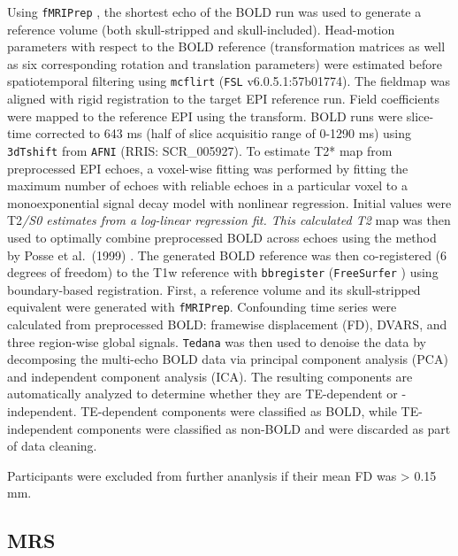 \documentclass[
true
]{sn-jnl}
\begin{document}
Using \texttt{fMRIPrep} \citep{estebanFMRIPrepRobustPreprocessing2019},
the shortest echo of the BOLD run was used to generate a reference
volume (both skull-stripped and skull-included). Head-motion parameters
with respect to the BOLD reference (transformation matrices as well as
six corresponding rotation and translation parameters) were estimated
before spatiotemporal filtering using \texttt{mcflirt}
\citep{jenkinsonImprovedOptimizationRobust2002} (\texttt{FSL}
v6.0.5.1:57b01774). The fieldmap was aligned with rigid registration to
the target EPI reference run. Field coefficients were mapped to the
reference EPI using the transform. BOLD runs were slice-time corrected
to 643 ms (half of slice acquisitio range of 0-1290 ms) using
\texttt{3dTshift} from \texttt{AFNI} \citep{coxAFNISoftwareAnalysis1996}
(RRIS: SCR\_005927). To estimate T2* map from preprocessed EPI echoes, a
voxel-wise fitting was performed by fitting the maximum number of echoes
with reliable echoes in a particular voxel to a monoexponential signal
decay model with nonlinear regression. Initial values were T2\emph{/S0
estimates from a log-linear regression fit. This calculated T2} map was
then used to optimally combine preprocessed BOLD across echoes using the
method by Posse et al.~(1999)
\citep{posseEnhancementBOLDcontrastSensitivity1999}. The generated BOLD
reference was then co-registered (6 degrees of freedom) to the T1w
reference with \texttt{bbregister} (\texttt{FreeSurfer}
\citep{daleCorticalSurfacebasedAnalysis1999}) using boundary-based
registration. First, a reference volume and its skull-stripped
equivalent were generated with \texttt{fMRIPrep}. Confounding time
series were calculated from preprocessed BOLD: framewise displacement
(FD), DVARS, and three region-wise global signals. \texttt{Tedana}
\citep{dupreTEdependentAnalysisMultiecho2021} was then used to denoise
the data by decomposing the multi-echo BOLD data via principal component
analysis (PCA) and independent component analysis (ICA). The resulting
components are automatically analyzed to determine whether they are
TE-dependent or -independent. TE-dependent components were classified as
BOLD, while TE-independent components were classified as non-BOLD and
were discarded as part of data cleaning.

Participants were excluded from further ananlysis if their mean FD was
\textgreater{} 0.15 mm.

\subsection{MRS}\label{mrs}
\end{document}
